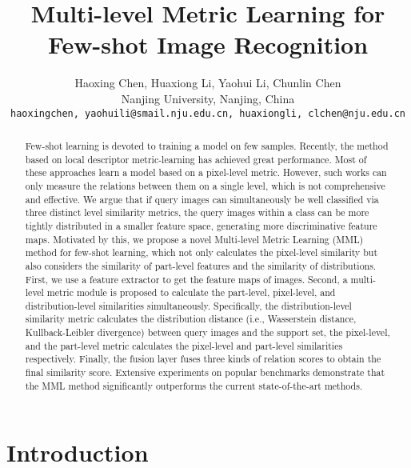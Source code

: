 \documentclass[10pt,twocolumn,letterpaper]{article}
\begin{document}
\title{Multi-level Metric Learning for Few-shot Image Recognition}

\author{Haoxing Chen, Huaxiong Li, Yaohui Li, Chunlin Chen\\
	Nanjing University, Nanjing, China\\
	{\tt\small haoxingchen, yaohuili@smail.nju.edu.cn, huaxiongli, clchen@nju.edu.cn}
}

\maketitle
\ificcvfinal\thispagestyle{empty}\fi

\begin{abstract}
	Few-shot learning is devoted to training a model on few samples. Recently, the method based on local descriptor metric-learning has achieved great performance. Most of these approaches learn a model based on a pixel-level metric. However, such works can only measure the relations between them on a single level, which is not comprehensive and effective. We argue that if query images can simultaneously be well classified via three distinct level similarity metrics, the query images within a class can be more tightly distributed in a smaller feature space, generating more discriminative feature maps. Motivated by this, we propose a novel Multi-level Metric Learning (MML) method for few-shot learning, which not only calculates the pixel-level similarity but also considers the similarity of part-level features and the similarity of distributions. First, we use a feature extractor to get the feature maps of images. Second, a multi-level metric module is proposed to calculate the part-level, pixel-level, and distribution-level similarities simultaneously. Specifically, the distribution-level similarity metric calculates the distribution distance (i.e., Wasserstein distance, Kullback-Leibler divergence) between query images and the support set, the pixel-level, and the part-level metric calculates the pixel-level and part-level similarities respectively. Finally, the fusion layer fuses three kinds of relation scores to obtain the final similarity score. Extensive experiments on popular benchmarks demonstrate that the MML method significantly outperforms the current state-of-the-art methods. 
\end{abstract}

\section{Introduction}
\end{document}
